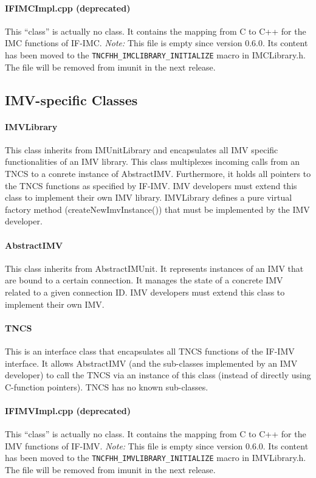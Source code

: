 \documentclass[a4paper,10pt]{scrartcl}
\begin{document}
\paragraph{IFIMCImpl.cpp (deprecated)}
This "`class"' is actually no class. It contains the mapping from C to C++ for the IMC functions
of IF-IMC. \emph{Note:} This file is empty since version 0.6.0. Its content has been moved to the \verb+TNCFHH_IMCLIBRARY_INITIALIZE+ macro
in IMCLibrary.h. The file will be removed from imunit in the next release.

\subsection{IMV-specific Classes}
\paragraph{IMVLibrary}
This class inherits from IMUnitLibrary and encapsulates all IMV specific functionalities of an IMV library. This class multiplexes incoming calls
from an TNCS to a conrete instance of AbstractIMV. Furthermore, it holds all pointers to the TNCS functions as specified by IF-IMV. IMV developers
must extend this class to implement their own IMV library. IMVLibrary defines a pure virtual factory method (createNewImvInstance()) that must
be implemented by the IMV developer.

\paragraph{AbstractIMV}
This class inherits from AbstractIMUnit. It represents instances of an IMV that are bound to a certain connection. It manages the state
of a concrete IMV related to a given connection ID. IMV developers must extend this class to implement their own IMV.

\paragraph{TNCS}
This is an interface class that encapsulates all TNCS functions of the IF-IMV interface. It allows AbstractIMV (and the sub-classes implemented
by an IMV developer) to call the TNCS via an instance of this class (instead of directly using C-function pointers). TNCS has no known sub-classes.

\paragraph{IFIMVImpl.cpp (deprecated)}
This "`class"' is actually no class. It contains the mapping from C to C++ for the IMV functions
of IF-IMV. \emph{Note:} This file is empty since version 0.6.0. Its content has been moved to the \verb+TNCFHH_IMVLIBRARY_INITIALIZE+ macro
in IMVLibrary.h. The file will be removed from imunit in the next release.
\end{document}

